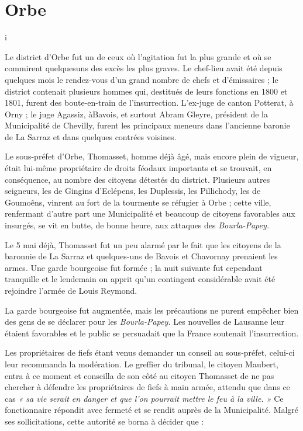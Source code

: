 \documentclass[french,twoside]{book} %
\begin{document}
\section[Orbe]{Orbe}
\noindent i\par
Le district d’Orbe fut un de ceux où l’agitation fut la plus grande et où se commirent quelquesuns des excès les plus graves. Le chef-lieu avait été depuis quelques mois le rendez-vous d’un grand nombre de chefs et d’émissaires ; le district contenait plusieurs hommes qui, destitués de leurs fonctions en 1800 et 1801, furent des boute-en-train de l’insurrection. L’ex-juge de canton Potterat, à Orny ; le juge Agassiz, àBavois, et surtout Abram Gleyre, président de la Municipalité de Chevilly, furent les principaux meneurs dans l’ancienne baronie de La Sarraz et dans quelques contrées voisines.\par
Le sous-préfet d’Orbe, Thomasset, homme déjà âgé, mais encore plein de vigueur, était lui-même propriétaire de droits féodaux importants et se trouvait, en conséquence, au nombre des citoyens détestés du district. Plusieurs autres seigneurs, les de Gingins d’Eclépens, les Duplessis, les Pillichody, les de Goumoêns, vinrent au fort de la tourmente se réfugier à Orbe ; cette ville, renfermant d’autre part une Municipalité et beaucoup de citoyens favorables aux insurgés, se vit en butte, de bonne heure, aux attaques des \emph{Bourla-Papey.}\par
Le 5 mai déjà, Thomasset fut un peu alarmé par le fait que les citoyens de la baronnie de La Sarraz et quelques-uns de Bavois et Chavornay prenaient les armes. Une garde bourgeoise fut formée ; la nuit suivante fut cependant tranquille et le lendemain on apprit qu’un contingent considérable avait été rejoindre l’armée de Louis Reymond.\par
La garde bourgeoise fut augmentée, mais les précautions ne purent empêcher bien des gens de se déclarer pour les \emph{Bourla-Papey.} Les nouvelles de Lausanne leur étaient favorables et le public se persuadait que la France soutenait l’insurrection.\par
Les propriétaires de fiefs étant venus demander un conseil au sous-préfet, celui-ci leur recommanda la modération. Le greffier du tribunal, le citoyen Maubert, entra à ce moment et conseilla de son côté au citoyen Thomasset de ne pas chercher à défendre les propriétaires de fiefs à main armée, attendu que dans ce cas \emph{« sa vie serait en danger et que l’on pourrait mettre le feu à la ville. »} Ce fonctionnaire répondit avec fermeté et se rendit auprès de la Municipalité. Malgré ses sollicitations, cette autorité se borna à décider que :\par
\end{document}

